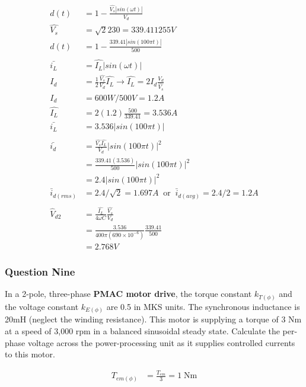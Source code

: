 \documentclass[a4paper,11pt]{article}
\begin{document}
\begin{align*}
    d(t) &= 1-\frac{\hat{V_s}|sin(\omega t)|}{V_d}\\
    \hat{V_s} &= \sqrt{2}230 = 339.411255V\\
    d(t) &= 1-\frac{339.41|sin(100\pi t)|}{500}\\\\
    \bar{i_L} &= \hat{I_L}|sin(\omega t)| \\
    I_d &= \frac{1}{2}\frac{\hat{V_s}}{V_d}\hat{I_L} \rightarrow \hat{I_L} = 2I_d \frac{V_d}{\hat{V_s}} \\
    I_d &= 600W/500V=1.2A \\
    \hat{I_L} &= 2(1.2) \frac{500}{339.41} = 3.536A \\
    \bar{i_L} &= 3.536|sin(100\pi t)| \\\\
    \bar{i_d} &= \frac{\hat{V_s}\hat{I_L}}{V_d}|sin(100\pi t)|^2 \\
              &= \frac{339.41(3.536)}{500}|sin(100\pi t)|^2\\
              &= 2.4|sin(100\pi t)|^2 \\
    \bar{i}_{d(rms)} &= 2.4/\sqrt{2} = 1.697A \;\;\mathrm{or}\;\; \bar{i}_{d(avg)} = 2.4/2 = 1.2A\\\\
    \hat{V}_{d2} &= \frac{\hat{I_L}}{4\omega C}\frac{\hat{V_s}}{V_d} \\
    &= \frac{3.536}{400\pi(690\times10^{-6})}\frac{339.41}{500} \\
    &= 2.768V
\end{align*}

\newpage
\subsubsection*{Question Nine}
In a 2-pole, three-phase \textbf{PMAC motor drive}, the torque constant $k_{T(\phi)}$ and the voltage constant $k_{E(\phi)}$ are 0.5 in MKS units. The synchronous inductance is 20mH (neglect the winding resistance). This motor is supplying a torque of 3 Nm at a speed of 3,000 rpm in a balanced sinusoidal steady state. Calculate the per-phase voltage across the power-processing unit as it supplies controlled currents to this motor.

\begin{align*}
    T_{em(\phi)} &= \frac{T_{em}}{3} = 1\;\mathrm{Nm}\\
\end{align*}
\end{document}
